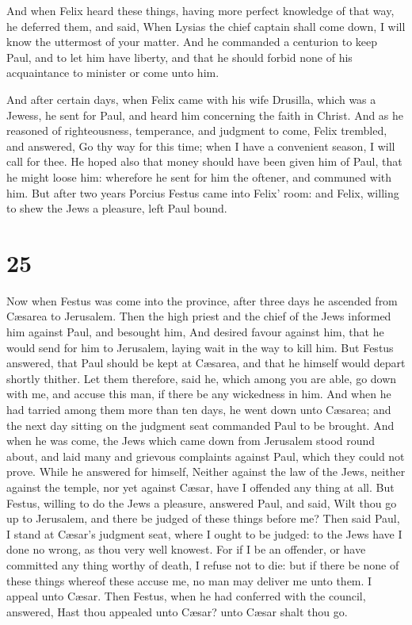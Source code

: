  And when Felix heard these things, having more perfect
knowledge of that way, he deferred them, and said, When Lysias the chief
captain shall come down, I will know the uttermost of your matter.
 And he commanded a centurion to keep Paul, and to let him
have liberty, and that he should forbid none of his acquaintance to
minister or come unto him.

 And after certain days, when Felix came with his wife
Drusilla, which was a Jewess, he sent for Paul, and heard him concerning
the faith in Christ.  And as he reasoned of righteousness,
temperance, and judgment to come, Felix trembled, and answered, Go thy
way for this time; when I have a convenient season, I will call for
thee.  He hoped also that money should have been given him
of Paul, that he might loose him: wherefore he sent for him the oftener,
and communed with him.  But after two years Porcius Festus
came into Felix' room: and Felix, willing to shew the Jews a pleasure,
left Paul bound.

\hypertarget{section-24}{%
\section{25}\label{section-24}}

 Now when Festus was come into the province, after three
days he ascended from Cæsarea to Jerusalem.  Then the high
priest and the chief of the Jews informed him against Paul, and besought
him,  And desired favour against him, that he would send for
him to Jerusalem, laying wait in the way to kill him.  But
Festus answered, that Paul should be kept at Cæsarea, and that he
himself would depart shortly thither.  Let them therefore,
said he, which among you are able, go down with me, and accuse this man,
if there be any wickedness in him.  And when he had tarried
among them more than ten days, he went down unto Cæsarea; and the next
day sitting on the judgment seat commanded Paul to be brought.
 And when he was come, the Jews which came down from
Jerusalem stood round about, and laid many and grievous complaints
against Paul, which they could not prove.  While he answered
for himself, Neither against the law of the Jews, neither against the
temple, nor yet against Cæsar, have I offended any thing at all.
 But Festus, willing to do the Jews a pleasure, answered
Paul, and said, Wilt thou go up to Jerusalem, and there be judged of
these things before me?  Then said Paul, I stand at Cæsar's
judgment seat, where I ought to be judged: to the Jews have I done no
wrong, as thou very well knowest.  For if I be an offender,
or have committed any thing worthy of death, I refuse not to die: but if
there be none of these things whereof these accuse me, no man may
deliver me unto them. I appeal unto Cæsar.  Then Festus,
when he had conferred with the council, answered, Hast thou appealed
unto Cæsar? unto Cæsar shalt thou go.

